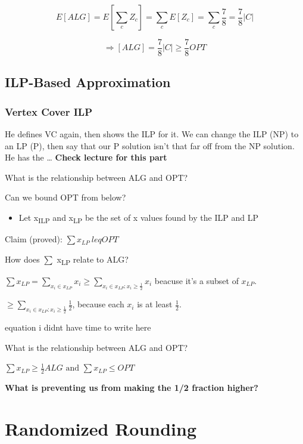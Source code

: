 \documentclass[11pt]{article}
\begin{document}
\[ E[ALG] = E[\sum_c Z_c] = \sum_c E[Z_c] = \sum_c \frac{7}{8} = \frac{7}{8} |C| \]

\[ \Longrightarrow [ALG] = \frac{7}{8} |C| \geq \frac{7}{8} OPT \]



\subsection{ILP-Based Approximation}
\label{sec:org449b4e5}

\subsubsection{Vertex Cover ILP}
\label{sec:org0451e03}

He defines VC again, then shows the ILP for it. We can change the ILP (NP) to an LP (P), then say that our P solution isn't that far off from the NP solution. He has the \ldots{} \textbf{\textbf{Check lecture for this part}}

What is the relationship between ALG and OPT?

Can we bound OPT from below?
\begin{itemize}
\item Let x\textsubscript{ILP} and x\textsubscript{LP} be the set of x values found by the ILP and LP
\end{itemize}

Claim (proved): \(\sum x_{LP} \ leq OPT\)

How does \(\sum\) x\textsubscript{LP} relate to ALG?

\(\sum x_{LP} = \sum_{x_i \in x_{LP}} x_i \geq \sum_{x_i \in x_{LP}:x_i \geq \frac{1}{2}} x_i\) beacuse it's a subset of \(x_{LP}\).

\(\geq \sum_{x_i \in x_{LP}:x_i \geq \frac{1}{2}} \frac{1}{2}\), because each \(x_i\) is at least \(\frac{1}{2}\).

equation i didnt have time to write here

What is the relationship between ALG and OPT?

\(\sum x_{LP} \geq \frac{1}{2} ALG \text{ and } \sum x_{LP} \leq OPT\)

\textbf{\textbf{What is preventing us from making the 1/2 fraction higher?}}

\section{Randomized Rounding}
\label{sec:orgec8e417}
\end{document}
